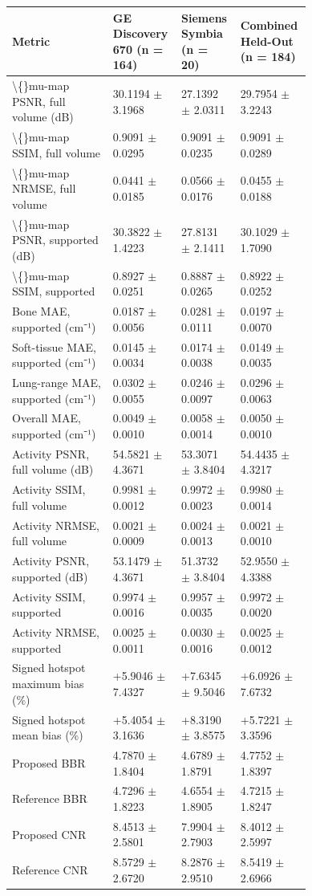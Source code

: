 \documentclass[11pt]{article}
\begin{document}
\begingroup\small\setlength{\tabcolsep}{3pt}\begin{longtable}{p{0.32\linewidth}p{0.14\linewidth}p{0.14\linewidth}p{0.14\linewidth}}
\toprule
Metric & GE Discovery 670 (n = 164) & Siemens Symbia (n = 20) & Combined Held-Out (n = 184) \\
\midrule
\textbackslash\{\}mu-map PSNR, full volume (dB) & 30.1194 $\pm$ 3.1968 & 27.1392 $\pm$ 2.0311 & 29.7954 $\pm$ 3.2243 \\
\textbackslash\{\}mu-map SSIM, full volume & 0.9091 $\pm$ 0.0295 & 0.9091 $\pm$ 0.0235 & 0.9091 $\pm$ 0.0289 \\
\textbackslash\{\}mu-map NRMSE, full volume & 0.0441 $\pm$ 0.0185 & 0.0566 $\pm$ 0.0176 & 0.0455 $\pm$ 0.0188 \\
\textbackslash\{\}mu-map PSNR, supported (dB) & 30.3822 $\pm$ 1.4223 & 27.8131 $\pm$ 2.1411 & 30.1029 $\pm$ 1.7090 \\
\textbackslash\{\}mu-map SSIM, supported & 0.8927 $\pm$ 0.0251 & 0.8887 $\pm$ 0.0265 & 0.8922 $\pm$ 0.0252 \\
Bone MAE, supported (cm⁻¹) & 0.0187 $\pm$ 0.0056 & 0.0281 $\pm$ 0.0111 & 0.0197 $\pm$ 0.0070 \\
Soft-tissue MAE, supported (cm⁻¹) & 0.0145 $\pm$ 0.0034 & 0.0174 $\pm$ 0.0038 & 0.0149 $\pm$ 0.0035 \\
Lung-range MAE, supported (cm⁻¹) & 0.0302 $\pm$ 0.0055 & 0.0246 $\pm$ 0.0097 & 0.0296 $\pm$ 0.0063 \\
Overall MAE, supported (cm⁻¹) & 0.0049 $\pm$ 0.0010 & 0.0058 $\pm$ 0.0014 & 0.0050 $\pm$ 0.0010 \\
Activity PSNR, full volume (dB) & 54.5821 $\pm$ 4.3671 & 53.3071 $\pm$ 3.8404 & 54.4435 $\pm$ 4.3217 \\
Activity SSIM, full volume & 0.9981 $\pm$ 0.0012 & 0.9972 $\pm$ 0.0023 & 0.9980 $\pm$ 0.0014 \\
Activity NRMSE, full volume & 0.0021 $\pm$ 0.0009 & 0.0024 $\pm$ 0.0013 & 0.0021 $\pm$ 0.0010 \\
Activity PSNR, supported (dB) & 53.1479 $\pm$ 4.3671 & 51.3732 $\pm$ 3.8404 & 52.9550 $\pm$ 4.3388 \\
Activity SSIM, supported & 0.9974 $\pm$ 0.0016 & 0.9957 $\pm$ 0.0035 & 0.9972 $\pm$ 0.0020 \\
Activity NRMSE, supported & 0.0025 $\pm$ 0.0011 & 0.0030 $\pm$ 0.0016 & 0.0025 $\pm$ 0.0012 \\
Signed hotspot maximum bias (\%) & +5.9046 $\pm$ 7.4327 & +7.6345 $\pm$ 9.5046 & +6.0926 $\pm$ 7.6732 \\
Signed hotspot mean bias (\%) & +5.4054 $\pm$ 3.1636 & +8.3190 $\pm$ 3.8575 & +5.7221 $\pm$ 3.3596 \\
Proposed BBR & 4.7870 $\pm$ 1.8404 & 4.6789 $\pm$ 1.8791 & 4.7752 $\pm$ 1.8397 \\
Reference BBR & 4.7296 $\pm$ 1.8223 & 4.6554 $\pm$ 1.8905 & 4.7215 $\pm$ 1.8247 \\
Proposed CNR & 8.4513 $\pm$ 2.5801 & 7.9904 $\pm$ 2.7903 & 8.4012 $\pm$ 2.5997 \\
Reference CNR & 8.5729 $\pm$ 2.6720 & 8.2876 $\pm$ 2.9510 & 8.5419 $\pm$ 2.6966 \\
\bottomrule
\end{longtable}\endgroup
\end{document}

